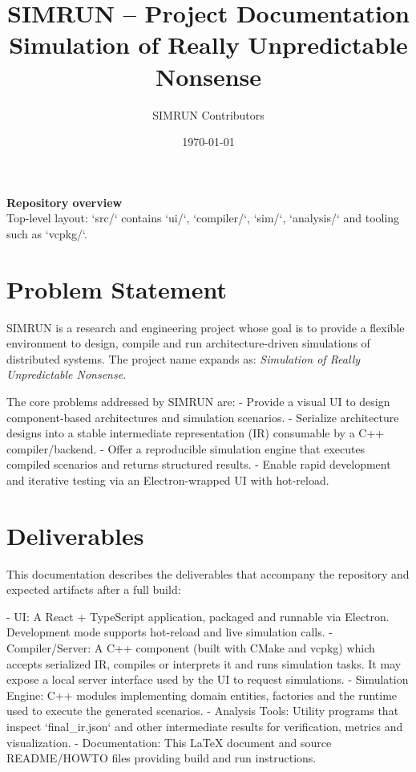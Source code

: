 \documentclass[11pt,a4paper]{article}
\title{SIMRUN -- Project Documentation\\\large Simulation of Really Unpredictable Nonsense}
\author{SIMRUN Contributors}
\date{\today}
\begin{document}
\maketitle
\thispagestyle{empty}
\vfill
\begin{center}
  \textbf{Repository overview}\\
  Top-level layout: `src/` contains `ui/`, `compiler/`, `sim/`, `analysis/` and tooling such as `vcpkg/`.
\end{center}
\newpage

\tableofcontents
\newpage

\section{Problem Statement}

SIMRUN is a research and engineering project whose goal is to provide a flexible environment to design, compile and run architecture-driven simulations of distributed systems. The project name expands as: \emph{Simulation of Really Unpredictable Nonsense}.

The core problems addressed by SIMRUN are:
- Provide a visual UI to design component-based architectures and simulation scenarios.
- Serialize architecture designs into a stable intermediate representation (IR) consumable by a C++ compiler/backend.
- Offer a reproducible simulation engine that executes compiled scenarios and returns structured results.
- Enable rapid development and iterative testing via an Electron-wrapped UI with hot-reload.

\section{Deliverables}

This documentation describes the deliverables that accompany the repository and expected artifacts after a full build:

- UI: A React + TypeScript application, packaged and runnable via Electron. Development mode supports hot-reload and live simulation calls.
- Compiler/Server: A C++ component (built with CMake and vcpkg) which accepts serialized IR, compiles or interprets it and runs simulation tasks. It may expose a local server interface used by the UI to request simulations.
- Simulation Engine: C++ modules implementing domain entities, factories and the runtime used to execute the generated scenarios.
- Analysis Tools: Utility programs that inspect `final_ir.json` and other intermediate results for verification, metrics and visualization.
- Documentation: This LaTeX document and source README/HOWTO files providing build and run instructions.
\end{document}
